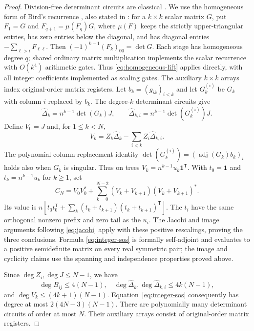 \documentclass[11pt,letterpaper]{article}
\theoremstyle{definition}\newtheorem{definition}[theorem]{Definition}
\theoremstyle{remark}\newtheorem{remark}[theorem]{Remark}
\DeclareMathOperator{\adj}{adj}\DeclareMathOperator{\End}{End}
\newcommand{\one}{\mathbf1}\newcommand{\M}{\mathcal M}
\begin{document}
\begin{proof}
Division-free determinant circuits are classical \cite{Berkowitz,Soltys,Bird}. We use the homogeneous form of Bird's recurrence \cite{Bird}, also stated in \cite[Theorem 1.1]{Przezdziecki}: for a $k\times k$ scalar matrix $G$, put $F_1=G$ and $F_{q+1}=\mu(F_q)G$, where $\mu(F)$ keeps the strictly upper-triangular entries, has zero entries below the diagonal, and has diagonal entries $-\sum_{\ell>i}F_{\ell\ell}$. Then $(-1)^{k-1}(F_k)_{00}=\det G$. Each stage has homogeneous degree $q$; shared ordinary matrix multiplication implements the scalar recurrence with $O(k^4)$ arithmetic gates. Thus \eqref{eq:homogeneous-lift} applies directly, with all integer coefficients implemented as scaling gates. The auxiliary $k\times k$ arrays index original-order matrix registers. Let $b_k=(g_{ik})_{i<k}$ and let $G_k^{(i)}$ be $G_k$ with column $i$ replaced by $b_k$. The degree-$k$ determinant circuits give
\[
\widehat\Delta_k=n^{k-1}\det(G_k)J,\qquad
\widehat\Delta_{k,i}=n^{k-1}\det(G_k^{(i)})J.
\]
Define $V_0=J$ and, for $1\le k<N$,
\[
V_k=Z_k\widehat\Delta_k-\sum_{i<k}Z_i\widehat\Delta_{k,i}.
\]
The polynomial column-replacement identity
$\det(G_k^{(i)})=(\adj(G_k)b_k)_i$ holds also when $G_k$ is singular. Thus on trees $V_k=n^{k-1}u_k\one^{\mathsf T}$. With $t_0=\one$ and $t_k=n^{k-1}u_k$ for $k\ge1$, set
\begin{equation}\label{eq:integer-sos}
C_N=V_0V_0^*+\sum_{k=0}^{N-2}(V_k+V_{k+1})(V_k+V_{k+1})^*.
\end{equation}
Its value is $n[t_0t_0^{\mathsf T}+\sum_k(t_k+t_{k+1})(t_k+t_{k+1})^{\mathsf T}]$. The $t_i$ have the same orthogonal nonzero prefix and zero tail as the $u_i$. The Jacobi and image arguments following \eqref{eq:jacobi} apply with these positive rescalings, proving the three conclusions. Formula \eqref{eq:integer-sos} is formally self-adjoint and evaluates to a positive semidefinite matrix on every real symmetric pair; the image and cyclicity claims use the spanning and independence properties proved above.

Since $\deg Z_i,\deg J\le N-1$, we have
\[
\deg B_{ij}\le4(N-1),\quad
\deg\widehat\Delta_k,\deg\widehat\Delta_{k,i}\le4k(N-1),
\]
and $\deg V_k\le(4k+1)(N-1)$. Equation~\eqref{eq:integer-sos} consequently has degree at most $2(4N-3)(N-1)$. There are polynomially many determinant circuits of order at most $N$. Their auxiliary arrays consist of original-order matrix registers.


\end{proof}
\end{document}
